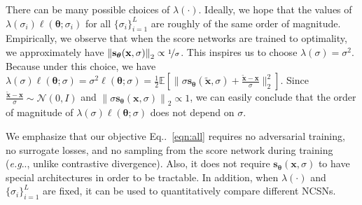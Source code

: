 \documentclass{article}
\makeatletter
\newcommand{\mbb}[1]{\mathbb{#1}}
\newcommand{\mcal}{\mathcal}
\newcommand{\norm}[1]{\left\lVert#1\right\rVert}
\def\@onedot{\ifx\@let@token.\else.\null\fi\xspace}
\DeclareRobustCommand\onedot{\futurelet\@let@token\@onedot}
\newcommand{\eqnref}[1]{Eq\onedot~\eqref{#1}}
\newcommand{\bfx}{\mathbf{x}}
\newcommand{\bftheta}{{\boldsymbol{\theta}}}
\newcommand{\bfs}{\mathbf{s}}
\def\eg{\emph{e.g}\onedot}
\makeatother
\begin{document}
There can be many possible choices of $\lambda(\cdot)$. Ideally, we hope that the values of $\lambda(\sigma_i)\ell(\bftheta; \sigma_i)$ for all $\{\sigma_i\}_{i=1}^L$ are roughly of the same order of magnitude. Empirically, we observe that when the score networks are trained 
to optimality,
we approximately have $\norm{\bfs_\bftheta(\bfx, \sigma)}_2 \propto \nicefrac{1}{\sigma}$. This inspires us to choose $\lambda(\sigma) = \sigma^2$. Because under this choice, we have $\lambda(\sigma)\ell(\bftheta; \sigma) = \sigma^2 \ell(\bftheta; \sigma) = \frac{1}{2}\mbb{E}[\|\sigma \bfs_\bftheta(\tilde{\bfx}, \sigma) + \frac{\tilde{\bfx} - \bfx}{\sigma}\|_2^2]$. Since $\frac{\tilde{\bfx} - \bfx}{\sigma} \sim \mcal{N}(0,I)$ and $\norm{\sigma \bfs_\bftheta(\bfx, \sigma)}_2 \propto 1$, we can easily conclude that the order of magnitude of $\lambda(\sigma)\ell(\bftheta; \sigma)$ does not depend on $\sigma$.


We emphasize that our objective \eqnref{eqn:all} requires no adversarial training, no surrogate losses, and no sampling from the score network during training (\eg, unlike contrastive divergence). Also, it does not require $\bfs_\bftheta(\bfx, \sigma)$ to have special architectures in order to be tractable. In addition, when $\lambda(\cdot)$ and $\{\sigma_i\}_{i=1}^L$ are fixed, it can be used to quantitatively compare different NCSNs.
\end{document}
